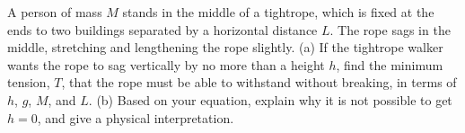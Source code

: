 A person of mass $M$ stands in the middle of a tightrope,
which is fixed at the ends to two buildings separated by a
horizontal distance $L$. The rope sags in the middle,
stretching and lengthening the rope slightly.\hwendpart
 (a) If the
tightrope walker wants the rope to sag vertically by no more
than a height $h$, find the minimum tension, $T$, that the
rope must be able to withstand without breaking, in terms of
$h$, $g$, $M$, and $L$.\answercheck\hwendpart
(b) Based on your equation, explain why it
is not possible to get $h=0$, and give a physical interpretation.
